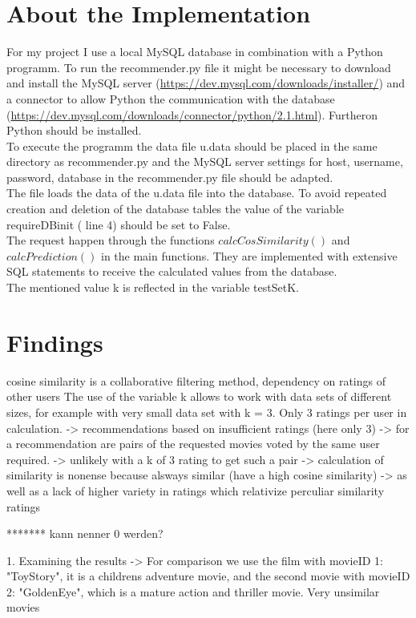 \documentclass[a4paper,12pt,twoside]{article}
\begin{document}
\section{About the Implementation}
For my project I use a local MySQL database in combination with a Python programm. To run the recommender.py file it might be necessary to download and install the MySQL server (\url{https://dev.mysql.com/downloads/installer/}) and a connector to allow Python the communication with the database (\url{https://dev.mysql.com/downloads/connector/python/2.1.html}). Furtheron Python should be installed.\\
To execute the programm the data file u.data should be placed in the same directory as recommender.py and the MySQL server settings for host, username, password, database in the recommender.py file should be adapted.\\
The file loads the data of the u.data file into the database. To avoid repeated creation and deletion of the database tables the value of the variable requireDBinit ( line 4) should be set to False. \\
The request happen through the functions $calcCosSimilarity()$ and $calcPrediction()$ in the main functions. They are implemented with extensive SQL statements to receive the calculated values from the database. \\
The mentioned value k is reflected in the variable testSetK.\\


\section{Findings}

cosine similarity is a collaborative filtering method, dependency on ratings of other users
The use of the variable k allows to work with data sets of different sizes, for example with very small data set with k = 3. Only 3 ratings per user in calculation.
-> recommendations based on insufficient ratings (here only 3)
-> for a recommendation are pairs of the requested movies voted by the same user required.
-> unlikely with a k of 3 rating to get such a pair -> calculation of similarity is nonense because alsways similar (have a high cosine similarity)
-> as well as a lack of higher variety in ratings which relativize perculiar similarity ratings

******* kann nenner 0 werden?

1. Examining the results
-> For comparison we use the film with movieID 1: "ToyStory", it is a childrens adventure movie, and the second movie with movieID 2: "GoldenEye", which is a mature action and thriller movie.
Very unsimilar movies
\end{document}
